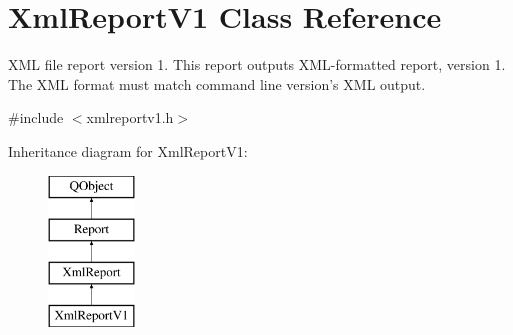\hypertarget{class_xml_report_v1}{\section{Xml\-Report\-V1 Class Reference}
\label{class_xml_report_v1}
}


X\-M\-L file report version 1. This report outputs X\-M\-L-\/formatted report, version 1. The X\-M\-L format must match command line version's X\-M\-L output.  




{\ttfamily \#include $<$xmlreportv1.\-h$>$}

Inheritance diagram for Xml\-Report\-V1\-:\begin{figure}[H]
\begin{center}
\leavevmode
\includegraphics[height=4.000000cm]{class_xml_report_v1}
\end{center}
\end{figure}
